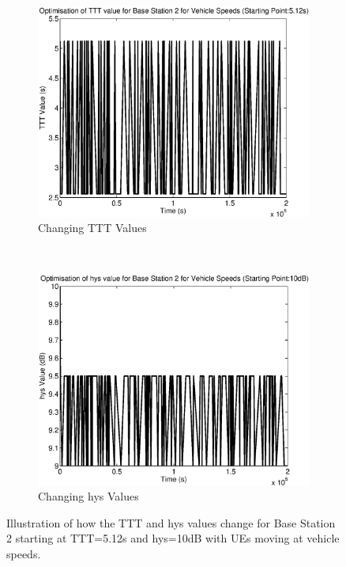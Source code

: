 \begin{figure}[H]
        \centering
        \begin{subfigure}[b]{0.49\textwidth}
                \includegraphics[width=\textwidth]{figures/graphs/vehhigh/TTT2.eps}
                \caption{Changing TTT Values}
        \end{subfigure}%
        ~ %
        \begin{subfigure}[b]{0.49\textwidth}
                \includegraphics[width=\textwidth]{figures/graphs/vehhigh/hys2.eps}
                \caption{Changing hys Values}
        \end{subfigure}
        \caption{Illustration of how the TTT and hys values change for Base Station 2 starting at TTT=5.12s and hys=10dB with UEs moving at vehicle speeds.}
\end{figure}

